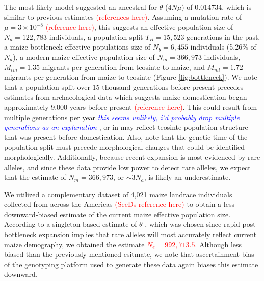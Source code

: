\documentclass{pnastwo}
\newcommand{\jri}[1]{\textcolor{blue}{\emph{#1}} }
\begin{document}
\begin{article}
The most likely model suggested an ancestral for $\theta$ ($4N\mu$) of
0.014734, which is similar to previous estimates
\textcolor{red}{(references here)}. Assuming a mutation rate of $\mu =
3 \times 10^{-8}$ \textcolor{red}{(reference here)}, this suggests an effective
population size of $N_a = 122,783$ individuals, a population split
$T_B = 15,523$ generations in the past, a maize bottleneck
effective populations size of $N_b = 6,455$ individuals (5.26\% of
$N_a$), a modern maize effective population size of $N_m = 366,973$
individuals, $M_{tm} = 1.35$ migrants per generation from teosinte to
maize, and $M_{mt} = 1.72$ migrants per generation from maize to
teosinte (Figure \ref{fig:bottleneck}). We note that a population
split over 15 thousand generations before present precedes estimates
from
archaeological data which suggests maize domestication began
approximately 9,000 years before present \textcolor{red}{(reference
  here)}. This could result from multiple generations per year \jri{this seems unlikely, i'd probably drop multiple generations as an explanation}, or in
may reflect teosinte population structure that was present before
domestication. Also, note that the genetic time of the population
split must precede morphological changes that could be identified
morphologically.   Additionally, because recent expansion is
most evidenced by rare alleles, and since these data provide low
power to detect rare alleles, we expect that the estimate of  $N_m =
366,973$, or $\sim 3N_a$, is likely an underestimate.

We utilized a complementary dataset of 4,021 maize landrace individuals collected
from across the Americas \textcolor{red}{(SeeDs reference here)} to
obtain a less downward-biased estimate of the current maize effective
population size. According to a singleton-based estimate of $\theta$
\cite{fu1993}, which was chosen since rapid post-bottleneck expansion
implies that rare alleles will most accurately reflect current maize
demography, we obtained the estimate \textcolor{red}{$N_e =
  992,713.5$}. Although less biased than the previously mentioned
esitmate, we note that ascertainment bias of the
genotyping platform used to generate these data again biases this
estimate downward.



\end{article}
\end{document}
